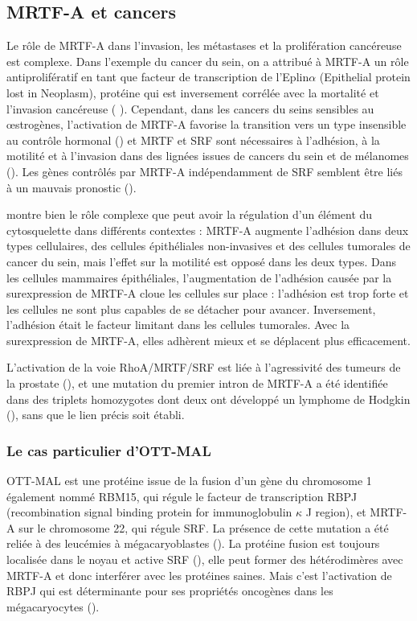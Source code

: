 \documentclass{report}
\begin{document}
\subsection{MRTF-A et cancers}
Le rôle de MRTF-A dans l'invasion, les métastases et la prolifération cancéreuse est complexe. 
Dans l'exemple du cancer du sein, on a attribué à MRTF-A un rôle antiprolifératif en tant que facteur de transcription de l'Eplin$\alpha$ (Epithelial protein lost in Neoplasm), protéine qui est inversement corrélée avec la mortalité et l'invasion cancéreuse ( \cite{leitner_epithelial_2010}).
Cependant, dans les cancers du seins sensibles au \oe strogènes, l'activation de MRTF-A favorise la transition vers un type insensible au contrôle hormonal (\cite{kerdivel_activation_2014}) et MRTF et SRF sont nécessaires à l'adhésion, à la motilité et à l'invasion dans des lignées issues de cancers du sein et de mélanomes (\cite{medjkane_myocardin-related_2009}).  
Les gènes contrôlés par MRTF-A indépendamment de SRF semblent être liés à un mauvais pronostic (\cite{gurbuz_sap_2014}). 

\cite{leitner_mal/mrtf-controls_2011} montre bien le rôle complexe que peut avoir la régulation d'un élément du cytosquelette dans différents contextes : MRTF-A augmente l'adhésion dans deux types cellulaires, des cellules épithéliales non-invasives et des cellules tumorales de cancer du sein, mais l'effet sur la motilité est opposé dans les deux types. Dans les cellules mammaires épithéliales, l'augmentation de l'adhésion causée par la surexpression de MRTF-A cloue les cellules sur place : l'adhésion est trop forte et les cellules ne sont plus capables de se détacher pour avancer. Inversement, l'adhésion était le facteur limitant dans les cellules tumorales. Avec la surexpression de MRTF-A, elles adhèrent mieux et se déplacent plus efficacement. 

L'activation de la voie RhoA/MRTF/SRF est liée à l'agressivité des tumeurs de la prostate (\cite{schmidt_rhoa_2012}), et une mutation du premier intron de MRTF-A a été identifiée dans des triplets homozygotes dont deux ont développé un lymphome de Hodgkin (\cite{bjorkholm_development_2013}), sans que le lien précis soit établi. 

\subsubsection{Le cas particulier d'OTT-MAL}

OTT-MAL est une protéine issue de la fusion d'un gène du chromosome 1 également nommé RBM15, qui régule le facteur de transcription RBPJ (recombination signal binding protein for immunoglobulin $\kappa$ J region), et MRTF-A sur le chromosome 22, qui régule SRF. La présence de cette mutation a été reliée à des leucémies à mégacaryoblastes (\cite{mercher_involvement_2001}). 
La protéine fusion est toujours localisée dans le noyau et active SRF (\cite{descot_ott-mal_2008}), elle peut former des hétérodimères avec MRTF-A et donc interférer avec les protéines saines. Mais c'est l'activation de RBPJ qui est déterminante pour ses propriétés oncogènes dans les mégacaryocytes (\cite{mercher_ott-mal_2009}). 
\end{document}
